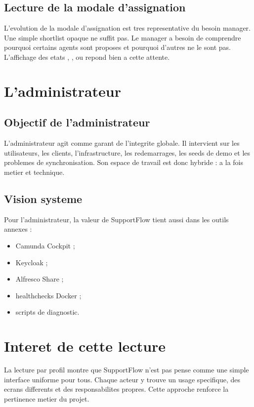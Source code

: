 \subsection{Lecture de la modale d'assignation}

L'evolution de la modale d'assignation est tres representative du besoin manager. Une simple shortlist opaque ne suffit pas. Le manager a besoin de comprendre pourquoi certains agents sont proposes et pourquoi d'autres ne le sont pas. L'affichage des etats , ,  ou  repond bien a cette attente.

\section{L'administrateur}

\subsection{Objectif de l'administrateur}

L'administrateur agit comme garant de l'integrite globale. Il intervient sur les utilisateurs, les clients, l'infrastructure, les redemarrages, les seeds de demo et les problemes de synchronisation. Son espace de travail est donc hybride : a la fois metier et technique.

\subsection{Vision systeme}

Pour l'administrateur, la valeur de SupportFlow tient aussi dans les outils annexes :

\begin{itemize}[leftmargin=1.2cm]
  \item Camunda Cockpit ;
  \item Keycloak ;
  \item Alfresco Share ;
  \item healthchecks Docker ;
  \item scripts de diagnostic.
\end{itemize}

\section{Interet de cette lecture}

La lecture par profil montre que SupportFlow n'est pas pense comme une simple interface uniforme pour tous. Chaque acteur y trouve un usage specifique, des ecrans differents et des responsabilites propres. Cette approche renforce la pertinence metier du projet.

